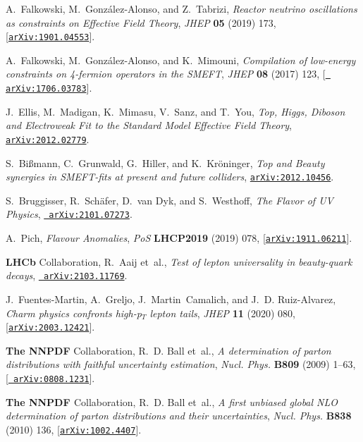 \documentclass[11pt,a4paper]{article}
\numberwithin{equation}{section}
\numberwithin{figure}{section}
\numberwithin{table}{section}
\begin{document}
\begin{thebibliography}{100}
A.~Falkowski, M.~González-Alonso, and Z.~Tabrizi, {\it {Reactor neutrino
  oscillations as constraints on Effective Field Theory}},  {\em JHEP} {\bf 05}
  (2019) 173, [\href{http://arxiv.org/abs/1901.04553}{{\tt arXiv:1901.04553}}].

A.~Falkowski, M.~González-Alonso, and K.~Mimouni, {\it {Compilation of
  low-energy constraints on 4-fermion operators in the SMEFT}},  {\em JHEP}
  {\bf 08} (2017) 123, [\href{http://arxiv.org/abs/1706.03783}{{\tt
  arXiv:1706.03783}}].

J.~Ellis, M.~Madigan, K.~Mimasu, V.~Sanz, and T.~You, {\it {Top, Higgs, Diboson
  and Electroweak Fit to the Standard Model Effective Field Theory}},
  \href{http://arxiv.org/abs/2012.02779}{{\tt arXiv:2012.02779}}.

S.~Bi\ss{}mann, C.~Grunwald, G.~Hiller, and K.~Kr\"oninger, {\it {Top and
  Beauty synergies in SMEFT-fits at present and future colliders}},
  \href{http://arxiv.org/abs/2012.10456}{{\tt arXiv:2012.10456}}.

S.~Bruggisser, R.~Sch\"afer, D.~van Dyk, and S.~Westhoff, {\it {The Flavor of
  UV Physics}},  \href{http://arxiv.org/abs/2101.07273}{{\tt
  arXiv:2101.07273}}.

A.~Pich, {\it {Flavour Anomalies}},  {\em PoS} {\bf LHCP2019} (2019) 078,
  [\href{http://arxiv.org/abs/1911.06211}{{\tt arXiv:1911.06211}}].

{\bf LHCb} Collaboration, R.~Aaij et~al., {\it {Test of lepton universality in
  beauty-quark decays}},  \href{http://arxiv.org/abs/2103.11769}{{\tt
  arXiv:2103.11769}}.

J.~Fuentes-Martin, A.~Greljo, J.~Martin~Camalich, and J.~D. Ruiz-Alvarez, {\it
  {Charm physics confronts high-p$_{T}$ lepton tails}},  {\em JHEP} {\bf 11}
  (2020) 080, [\href{http://arxiv.org/abs/2003.12421}{{\tt arXiv:2003.12421}}].

{\bf The NNPDF} Collaboration, R.~D. Ball et~al., {\it {A determination of
  parton distributions with faithful uncertainty estimation}},  {\em Nucl.
  Phys.} {\bf B809} (2009) 1--63, [\href{http://arxiv.org/abs/0808.1231}{{\tt
  arXiv:0808.1231}}].

{\bf {The NNPDF }} Collaboration, R.~D. Ball et~al., {\it {A first unbiased
  global NLO determination of parton distributions and their uncertainties}},
  {\em Nucl. Phys.} {\bf B838} (2010) 136,
  [\href{http://arxiv.org/abs/1002.4407}{{\tt arXiv:1002.4407}}].


\end{thebibliography}
\end{document}
